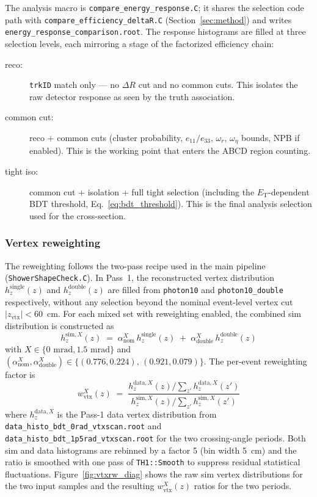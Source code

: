 \documentclass[11pt,letterpaper]{article}
\newcommand{\DR}{\ensuremath{\Delta R}}
\newcommand{\ET}{\ensuremath{E_{\text{T}}}}
\newcommand{\zvtx}{\ensuremath{z_{\mathrm{vtx}}}}
\begin{document}
The analysis macro is \texttt{compare\_energy\_response.C}; it shares the
selection code path with \texttt{compare\_efficiency\_deltaR.C}
(Section~\ref{sec:method}) and writes \texttt{energy\_response\_comparison.root}.
The response histograms are filled at three selection levels, each mirroring a
stage of the factorized efficiency chain:

\begin{description}
  \item[reco:] \texttt{trkID} match only — no $\DR$ cut and no common
    cuts. This isolates the raw detector response as seen by the truth
    association.
  \item[common cut:] reco $+$ common cuts (cluster probability,
    $e_{11}/e_{33}$, $\omega_r$, $\omega_\eta$ bounds, NPB if enabled).
    This is the working point that enters the ABCD region counting.
  \item[tight iso:] common cut $+$ isolation $+$ full tight selection
    (including the \ET-dependent BDT threshold, Eq.~\ref{eq:bdt_threshold}).
    This is the final analysis selection used for the cross-section.
\end{description}

\subsubsection{Vertex reweighting}
\label{sec:resp_vtxrw}

The reweighting follows the two-pass recipe used in the main pipeline
(\texttt{ShowerShapeCheck.C}). In Pass~1, the reconstructed vertex
distribution $h_{z}^{\text{single}}(z)$ and $h_{z}^{\text{double}}(z)$ are
filled from \texttt{photon10} and \texttt{photon10\_double} respectively,
without any selection beyond the nominal event-level vertex cut
$|\zvtx|<60$~cm. For each mixed set with reweighting enabled, the
combined sim distribution is constructed as
\begin{equation}
  h_{z}^{\text{sim},X}(z) \;=\; \alpha_{\text{nom}}^{X}\,h_{z}^{\text{single}}(z)
    \;+\; \alpha_{\text{double}}^{X}\,h_{z}^{\text{double}}(z)
  \label{eq:sim_vtx_combo}
\end{equation}
with $X \in \{0\text{ mrad}, 1.5\text{ mrad}\}$ and
$(\alpha_{\text{nom}}^{X},\alpha_{\text{double}}^{X}) \in
\{(0.776, 0.224),\,(0.921, 0.079)\}$. The per-event reweighting factor is
\begin{equation}
  w_{\text{vtx}}^{X}(z) \;=\; \frac{h_{z}^{\text{data},X}(z) \big/
      \sum_{z'} h_{z}^{\text{data},X}(z')}
                        {h_{z}^{\text{sim},X}(z)  \big/
      \sum_{z'} h_{z}^{\text{sim},X}(z')}
  \label{eq:vtx_rw}
\end{equation}
where $h_{z}^{\text{data},X}$ is the Pass-1 data vertex distribution from
\texttt{data\_histo\_bdt\_0rad\_vtxscan.root} and
\texttt{data\_histo\_bdt\_1p5rad\_vtxscan.root} for the two crossing-angle
periods. Both sim and data histograms are rebinned by a factor 5 (bin width
5~cm) and the ratio is smoothed with one pass of
\texttt{TH1::Smooth} to suppress residual statistical fluctuations.
Figure~\ref{fig:vtxrw_diag} shows the raw sim vertex distributions for the
two input samples and the resulting $w_{\text{vtx}}^{X}(z)$ ratios for the
two periods.
\end{document}

